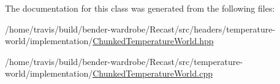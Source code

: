 The documentation for this class was generated from the following files\-:\begin{DoxyCompactItemize}
\item 
/home/travis/build/bender-\/wardrobe/\-Recast/src/headers/temperature-\/world/implementation/\hyperlink{_chunked_temperature_world_8hpp}{Chunked\-Temperature\-World.\-hpp}\item 
/home/travis/build/bender-\/wardrobe/\-Recast/src/temperature-\/world/implementation/\hyperlink{_chunked_temperature_world_8cpp}{Chunked\-Temperature\-World.\-cpp}\end{DoxyCompactItemize}

